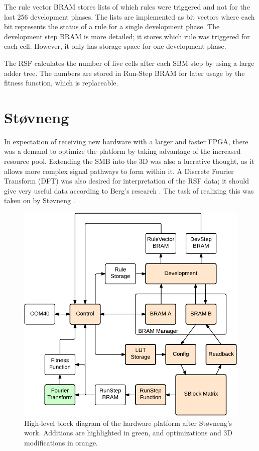 The rule vector BRAM stores lists of which rules were triggered and not for the last 256 development phases.
The lists are implemented as bit vectors where each bit represents the status of a rule for a single development phase.
The development step BRAM is more detailed; it stores which rule was triggered for each cell.
However, it only has storage space for one development phase.

The RSF calculates the number of live cells after each SBM step by using a large adder tree.
The numbers are stored in Run-Step BRAM for later usage by the fitness function, which is replaceable.


\section{Støvneng}

In expectation of receiving new hardware with a larger and faster FPGA, there was a demand to optimize the platform by taking advantage of the increased resource pool.
Extending the SMB into the 3D was also a lucrative thought, as it allows more complex signal pathways to form within it.
A Discrete Fourier Transform (DFT) was also desired for interpretation of the RSF data; it should give very useful data according to Berg's research \cite{berg2013ca}.
The task of realizing this was taken on by Støvneng \cite{stovneng2014sblock}.

\begin{figure}[!ht]
    \centering
    \includegraphics[width=42\block]{figures/overview-stovneng}
    \caption[Støvneng's hardware design]{
        High-level block diagram of the hardware platform after Støvneng's work.
        Additions are highlighted in green, and optimizations and 3D modifications in orange.
    }
    \label{fig:overview-stovneng}
\end{figure}

